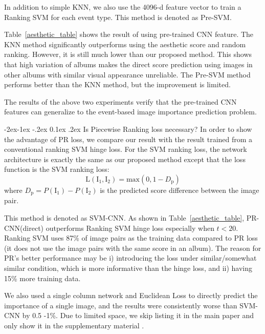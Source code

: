 \documentclass[10pt,twocolumn,letterpaper]{article}
\makeatletter
\renewcommand\subsubsection{\@startsection{subsubsection}{3}{\z@}%
                {-2ex\@plus -1ex \@minus -.2ex}%
                {0.1ex \@plus .2ex}%
                {\normalfont\normalsize\bfseries}}
\makeatother
\begin{document}
In addition to simple KNN, we also use the 4096-d feature vector to train a Ranking SVM for each event type. This method is denoted as Pre-SVM.

Table~\ref{aesthetic_table} shows the result of using pre-trained CNN feature. The KNN method significantly outperforms using the aesthetic score and random ranking. However, it is still much lower than our proposed method. This shows that high variation of albums makes the direct score prediction using images in other albums with similar visual appearance unreliable. The Pre-SVM method performs better than the KNN method, but the improvement is limited. 

The results of the above two experiments verify that the pre-trained CNN features can generalize to the event-based image importance prediction problem.

\subsubsection{Is Piecewise Ranking loss necessary?}
In order to show the advantage of PR loss, we compare our result with the result trained from a conventional ranking SVM hinge loss. For the SVM ranking loss, the network architecture is exactly the same as our proposed method except that the loss function is the SVM ranking loss:
\begin{equation} 
\text{L}(\text{I}_{1}, \text{I}_{2}) = \text{max}(0, 1-D_\text{p}) 
\end{equation}
where $D_\text{p} = P(\text{I}_{1})-P(\text{I}_{2})$ is the predicted score difference between the image pair.

This method is denoted as SVM-CNN. As shown in Table~\ref{aesthetic_table}, PR-CNN(direct) outperforms Ranking SVM hinge loss especially when $t < 20$. Ranking SVM uses 87\% of image pairs as the training data compared to PR loss (it does not use the image pairs with the same score in an album). The reason for PR's better performance may be i) introducing the loss under similar/somewhat similar condition, which is more informative than the hinge loss, and ii) having 15\% more training data.

We also used a single column network and Euclidean Loss to directly predict the importance of a single image, and the results were consistently worse than SVM-CNN by 0.5 -1\%. Due to limited space, we skip listing it in the main paper and only show it in the supplementary material \cite{supplementary}.
\end{document}
